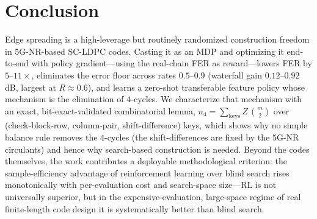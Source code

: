 \documentclass[journal]{IEEEtran}
\begin{document}
\section{Conclusion}\label{sec:conclusion}
Edge spreading is a high-leverage but routinely randomized construction freedom
in 5G-NR-based SC-LDPC codes. Casting it as an MDP and optimizing it end-to-end
with policy gradient---using the real-chain FER as reward---lowers FER by
$5$--$11\times$, eliminates the error floor across rates $0.5$--$0.9$ (waterfall
gain $0.12$--$0.92$\,dB, largest at $R\!\approx\!0.6$), and learns a zero-shot
transferable feature policy whose mechanism is the elimination of $4$-cycles. We
characterize that mechanism with an exact, bit-exact-validated combinatorial
lemma, $n_4=\sum_{\mathrm{keys}} Z\,\binom{m}{2}$ over (check-block-row,
column-pair, shift-difference) keys, which shows why no simple balance rule
removes the $4$-cycles (the shift-differences are fixed by the 5G-NR circulants)
and hence why search-based construction is needed. Beyond the codes themselves, the
work contributes a deployable methodological criterion: the sample-efficiency
advantage of reinforcement learning over blind search rises monotonically with
per-evaluation cost and search-space size---RL is not universally superior, but in
the expensive-evaluation, large-space regime of real finite-length code design it
is systematically better than blind search.



\end{document}
